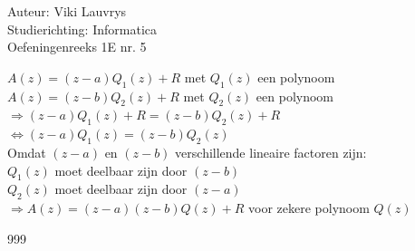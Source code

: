 \documentclass[a4paper]{article}
\begin{document}
  
\noindent \large Auteur: Viki Lauvrys        \\
\noindent \large Studierichting: Informatica \\
\noindent \large Oefeningenreeks 1E nr. 5 \\

\medskip

\normalsize

$ A(z) = (z - a) Q_1(z) + R $ met $ Q_1(z) $ een polynoom \\

$ A(z) = (z - b) Q_2(z) + R $ met $ Q_2(z) $ een polynoom \\

$ \Rightarrow (z - a) Q_1(z) + R = (z - b) Q_2(z) + R $ \\

$ \Leftrightarrow (z - a) Q_1(z) = (z - b) Q_2(z) $ \\

Omdat $ (z - a) $ en $ (z - b) $ verschillende lineaire factoren zijn: \\

$ Q_1(z) $ moet deelbaar zijn door $ (z - b) $ \\

$ Q_2(z) $ moet deelbaar zijn door $ (z - a) $ \\

$ \Rightarrow A(z) = (z - a)(z - b)Q(z) + R $ voor zekere polynoom $ Q(z) $ \\


\begin{thebibliography}{999}
\end{thebibliography}
\end{document}
